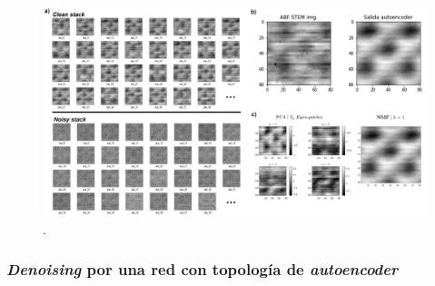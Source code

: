 
\newpage

\begin{figure}[h!]
    \centering
    \includegraphics[width=1\textwidth]{fig/Fig17.png}
    \caption{ \cite{repo}.}
    \label{fig:17}
\end{figure}

\subsubsection{\textit{Denoising} por una red con topología de \textit{autoencoder}}






